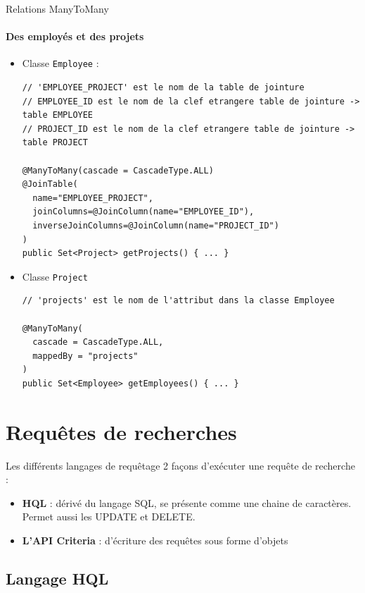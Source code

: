 \documentclass[compress]{beamer}%
\begin{document}
\begin{frame}[fragile]{Relations ManyToMany}
	\framesubtitle{Des employés et des projets}
	\begin{itemize}[<+->]
		\item Classe \texttt{Employee} : 
		\begin{lstlisting}
// 'EMPLOYEE_PROJECT' est le nom de la table de jointure
// EMPLOYEE_ID est le nom de la clef etrangere table de jointure -> table EMPLOYEE
// PROJECT_ID est le nom de la clef etrangere table de jointure -> table PROJECT

@ManyToMany(cascade = CascadeType.ALL)
@JoinTable(
  name="EMPLOYEE_PROJECT",
  joinColumns=@JoinColumn(name="EMPLOYEE_ID"),
  inverseJoinColumns=@JoinColumn(name="PROJECT_ID")
)
public Set<Project> getProjects() { ... }
		\end{lstlisting}
	
		\item Classe \texttt{Project}
		\begin{lstlisting}
// 'projects' est le nom de l'attribut dans la classe Employee

@ManyToMany(
  cascade = CascadeType.ALL,
  mappedBy = "projects"
)
public Set<Employee> getEmployees() { ... }
		\end{lstlisting}	
	\end{itemize}

\end{frame}



	
\section{Requêtes de recherches}

\begin{frame}{Les différents langages de requêtage}
	2 façons d'exécuter une requête de recherche :
	\begin{itemize}[<+->]
		\item \textbf{HQL} : dérivé du langage SQL, se présente comme une chaine de caractères. Permet aussi les UPDATE et DELETE.
		\item \textbf{L'API Criteria} : d'écriture des requêtes sous forme d'objets
	\end{itemize}

\end{frame}


\subsection{Langage HQL}
\end{document}
